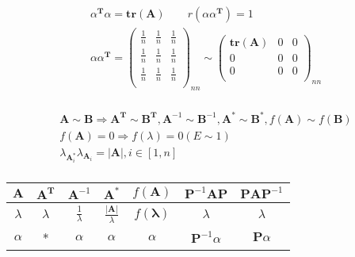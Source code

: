 \documentclass{article}
\begin{document}
\begin{align*} 
    \alpha^{\mathbf{T}}\alpha = \mathbf{tr(A)} \qquad r(\alpha\alpha^{\mathbf{T}}) = 1 \\ 
    \alpha \alpha^{\mathbf{T}} = \left( 
        \begin{array}{ccc}
            \frac{1}{n} & \frac{1}{n} & \frac{1}{n} \\ 
            \frac{1}{n} & \frac{1}{n} & \frac{1}{n} \\ 
            \frac{1}{n} & \frac{1}{n} & \frac{1}{n} \\  
        \end{array}  
    \right)_{nn} \sim \left( 
        \begin{array}{ccc} 
            \mathbf{tr(A)} & 0 & 0 \\ 
            0 & 0 & 0 \\ 
            0 & 0 & 0 \\
        \end{array}  
    \right)_{nn} \\ 
\end{align*}

\begin{align*}
    \mathbf{A} \sim \mathbf{B} \Longrightarrow \mathbf{A}^{\mathbf{T}} \sim \mathbf{B}^{\mathbf{T}},\mathbf{A}^{-1} \sim \mathbf{B}^{-1},\mathbf{A}^{\mathbf{*}} \sim \mathbf{B}^{\mathbf{*}},f(\mathbf{A}) \sim f(\mathbf{B}) \\ 
    f(\mathbf{A})=0 \Rightarrow f(\lambda) = 0 (E \sim 1)\\ 
    \lambda_{\mathbf{A}^{*}_{i}} \lambda_{\mathbf{A}_{i}} = |\mathbf{A}|,i \in [1,n]\\ 
\end{align*}

\begin{tabular}{|c|c|c|c|c|c|c|}%
    \hline 
    $\mathbf{A}$ & $\mathbf{A}^{\mathbf{T}}$ & $\mathbf{A}^{-1}$ & $\mathbf{A}^{*}$ & $f(\mathbf{A})$ & $\mathbf{P}^{-1}\mathbf{A}\mathbf{P}$ & $\mathbf{P}\mathbf{A}\mathbf{P}^{-1}$ \\   
    \hline
    $\lambda$ & $\lambda$ & $\frac{1}{\lambda}$ & $\frac{|\mathbf{A}|}{\lambda}$ & $f(\mathbf{\lambda})$ & $\lambda$ & $\lambda$ \\ 
    \hline 
    $\alpha$ & * & $\alpha$ & $\alpha$ & $\alpha$ & $\mathbf{P}^{-1}\alpha$ & $\mathbf{P}\alpha$ \\ 
    \hline 
\end{tabular}
\end{document}
